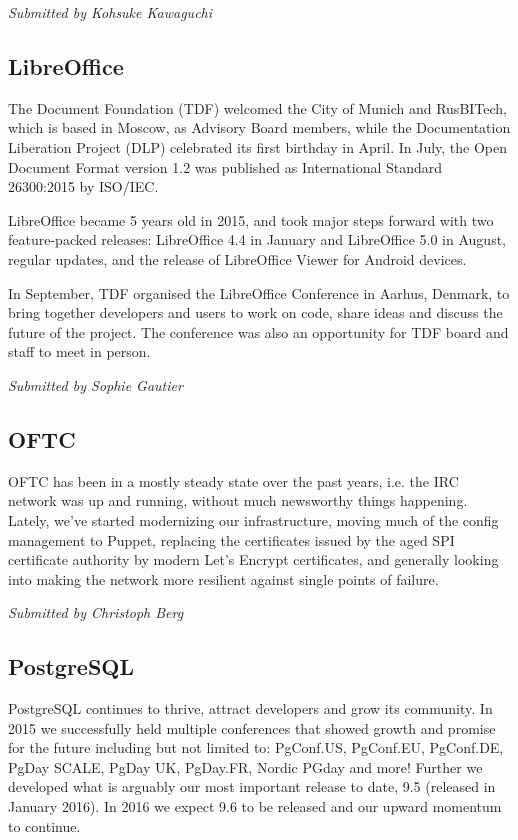 \documentclass[letterpaper]{report}
\begin{document}
{\em Submitted by Kohsuke Kawaguchi}

\subsection{LibreOffice}

The Document Foundation (TDF) welcomed the City of Munich and RusBITech,
which is based in Moscow, as Advisory Board members, while the
Documentation Liberation Project (DLP) celebrated its first birthday in
April. In July, the Open Document Format version 1.2 was published as
International Standard 26300:2015 by ISO/IEC.

LibreOffice became 5 years old in 2015, and took major steps forward with
two feature-packed releases: LibreOffice 4.4 in January and LibreOffice 5.0
in August, regular updates, and the release of LibreOffice Viewer for
Android devices.

In September, TDF organised the LibreOffice Conference in Aarhus, Denmark,
to bring together developers and users to work on code, share ideas and
discuss the future of the project. The conference was also an opportunity
for TDF board and staff to meet in person.

{\em Submitted by Sophie Gautier}

\subsection{OFTC}

OFTC has been in a mostly steady state over the past years, i.e. the IRC
network was up and running, without much newsworthy things happening.
Lately, we've started modernizing our infrastructure, moving much of the
config management to Puppet, replacing the certificates issued by the aged
SPI certificate authority by modern Let's Encrypt certificates, and
generally looking into making the network more resilient against single
points of failure.

{\em Submitted by Christoph Berg}

\subsection{PostgreSQL}

PostgreSQL continues to thrive, attract developers and grow its community.
In 2015 we successfully held multiple conferences that showed growth and
promise for the future including but not limited to: PgConf.US, PgConf.EU,
PgConf.DE, PgDay SCALE, PgDay UK, PgDay.FR, Nordic PGday and more! Further
we developed what is arguably our most important release to date, 9.5
(released in January 2016). In 2016 we expect 9.6 to be released and our
upward momentum to continue.
\end{document}
